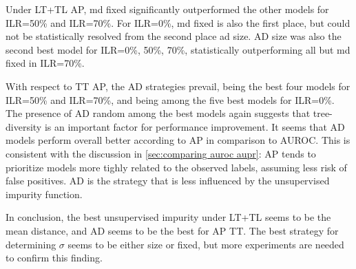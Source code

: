 Under LT+TL AP, md fixed significantly outperformed the other models for ILR=50\% and ILR=70\%. For ILR=0\%, md fixed is also the first place, but could not be statistically resolved from the second place ad size. AD size was also the second best model for ILR=0\%, 50\%, 70\%, statistically outperforming all but md fixed in ILR=70\%.

With respect to TT AP, the AD strategies prevail, being the best four models for ILR=50\% and ILR=70\%, and being among the five best models for ILR=0\%. The presence of AD random among the best models again suggests that tree-diversity is an important factor for performance improvement.
%
It seems that AD models perform overall better according to AP in comparison to AUROC. This is consistent with the discussion in \autoref{sec:comparing auroc aupr}: AP tends to prioritize models more tighly related to the observed labels, assuming less risk of false positives. AD is the strategy that is less influenced by the unsupervised impurity function.

In conclusion, the best unsupervised impurity under LT+TL seems to be the mean distance, and AD seems to be the best for AP TT. The best strategy for determining $\sigma$ seems to be either size or fixed, but more experiments are needed to confirm this finding.


